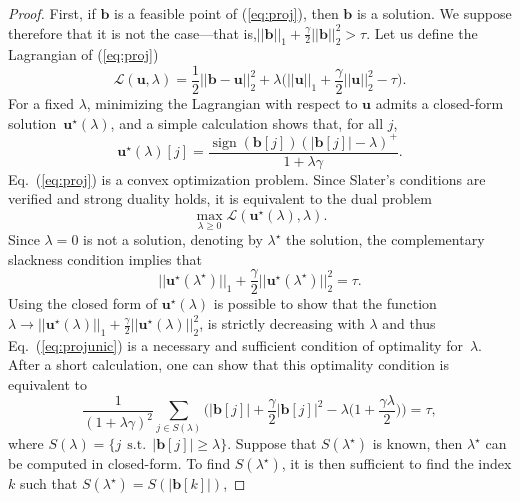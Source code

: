 \documentclass[twoside,11pt]{article}
\def\L{{\mathcal L}}
\def\b{{\mathbf b}}
\def\u{{\mathbf u}}
\def\u{{\mathbf u}}
\def\sign{\operatorname{sign}}
\def\st{~~\text{s.t.}~~}
\begin{document}
\begin{proof}
   First, if $\b$ is a feasible point of (\ref{eq:proj}), then $\b$ is a
   solution.  We suppose therefore that it is not the case---that is,$||\b||_1
   + \frac{\gamma}{2}||\b||_2^2 > \tau$.  Let us define the Lagrangian of
   (\ref{eq:proj})
   \begin{displaymath}
      \L(\u,\lambda) = \frac{1}{2}||\b-\u||_2^2 + \lambda\big(||\u||_1 +
      \frac{\gamma}{2}||\u||_2^2 - \tau\big).
   \end{displaymath}
   For a fixed $\lambda$, minimizing the Lagrangian with respect to $\u$ admits
   a closed-form solution~$\u^\star(\lambda)$, and a simple calculation shows that, for all $j$,
   \begin{displaymath}
      \u^\star(\lambda)[j] = \frac{\sign(\b[j])(|\b[j]|-\lambda)^+}{1+\lambda\gamma}.
   \end{displaymath}
   Eq.~(\ref{eq:proj}) is a convex optimization problem. Since Slater's
   conditions are verified and strong duality holds, it is
   equivalent to the dual problem
   \begin{displaymath}
      \max_{\lambda \geq 0} \L(\u^\star(\lambda),\lambda).
   \end{displaymath}
   Since $\lambda=0$ is not a solution, denoting by $\lambda^\star$ the solution,
   the complementary slackness condition implies that 
   \begin{equation}
      ||\u^\star(\lambda^\star)||_1 +
      \frac{\gamma}{2}||\u^\star(\lambda^\star)||_2^2 = \tau.
      \label{eq:projunic}
   \end{equation}
   Using the closed form of $\u^\star(\lambda)$ is possible to show that the function
   $\lambda \to ||\u^\star(\lambda)||_1 + \frac{\gamma}{2}||\u^\star(\lambda)||_2^2$,
   is strictly decreasing with $\lambda$ and thus Eq.~(\ref{eq:projunic}) is
   a necessary and sufficient condition of optimality for~$\lambda$.
   After a short calculation, one can show that this optimality condition is equivalent to
   \begin{displaymath}
      \frac{1}{(1+\lambda\gamma)^2} \sum_{ j \in S(\lambda)} \Big( |\b[j]| +
      \frac{\gamma}{2}|\b[j]|^2 -
      \lambda\big(1+\frac{\gamma\lambda}{2}\big)\Big)= \tau,
   \end{displaymath}
   where $S(\lambda) = \{ j \st |\b[j]| \geq \lambda \}$.
   Suppose that $S(\lambda^\star)$ is known, then $\lambda^\star$ can be
   computed in closed-form.
   To find $S(\lambda^\star)$, it is then sufficient to find the index
   $k$ such that $S(\lambda^\star) = S(|\b[k]|)$, 

\end{proof}
\end{document}
